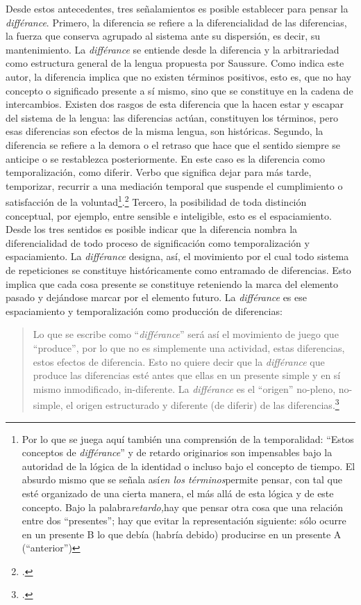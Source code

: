 Desde estos antecedentes, tres señalamientos es posible establecer para pensar la \emph{différance}. Primero, la diferencia se refiere a la diferencialidad de las diferencias, la fuerza que conserva agrupado al sistema ante su dispersión, es decir, su mantenimiento. La \emph{différance} se entiende desde la diferencia y la arbitrariedad como estructura general de la lengua propuesta por Saussure. Como indica este autor, la diferencia implica que no existen términos positivos, esto es, que no hay concepto o significado presente a sí mismo, sino que se constituye en la cadena de intercambios. Existen dos rasgos de esta diferencia que la hacen estar y escapar del sistema de la lengua: las diferencias actúan, constituyen los términos, pero esas diferencias son efectos de la misma lengua, son históricas. Segundo, la diferencia se refiere a la demora o el retraso que hace que el sentido siempre se anticipe o se restablezca posteriormente. En este caso es la diferencia como temporalización, como diferir. Verbo que significa dejar para más tarde, temporizar, recurrir a una mediación temporal que suspende el cumplimiento o satisfacción de la voluntad\footnote{Por lo que se juega aquí también una comprensión de la temporalidad: \enquote{Estos conceptos de \emph{différance}} y de retardo originarios son impensables bajo la autoridad de la lógica de la identidad o incluso bajo el concepto de tiempo. El absurdo mismo que se señala así\emph{en los términos}permite pensar, con tal que esté organizado de una cierta manera, el más allá de esta lógica y de este concepto. Bajo la palabra\emph{retardo,}hay que pensar otra cosa que una relación entre dos \enquote{presentes}; hay que evitar la representación siguiente: sólo ocurre en un presente B lo que debía (habría debido) producirse en un presente A (\enquote{anterior})}.\footcite[280]{@6982-DERRIDA1989}  Tercero, la posibilidad de toda distinción conceptual, por ejemplo, entre sensible e inteligible, esto es el espaciamiento. Desde los tres sentidos es posible indicar que la diferencia nombra la diferencialidad de todo proceso de significación como temporalización y espaciamiento. La \emph{différance} designa, así, el movimiento por el cual todo sistema de repeticiones se constituye históricamente como entramado de diferencias. Esto implica que cada cosa presente se constituye reteniendo la marca del elemento pasado y dejándose marcar por el elemento futuro. La \emph{différance} es ese espaciamiento y temporalización como producción de diferencias:

\begin{quote}
Lo que se escribe como \enquote{\emph{différance}} será así el movimiento de juego que \enquote{produce}, por lo que no es simplemente una actividad, estas diferencias, estos efectos de diferencia. Esto no quiere decir que la \emph{différance} que produce las diferencias esté antes que ellas en un presente simple y en sí mismo inmodificado, in-diferente. La \emph{différance} es el \enquote{origen} no-pleno, no-simple, el origen estructurado y diferente (de diferir) de las diferencias.\footcite[12]{@6980-DERRIDA1989}
\end{quote}


